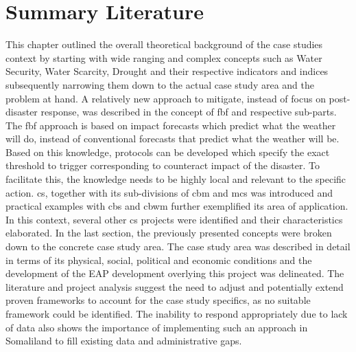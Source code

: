 
\section{Summary Literature}

This chapter outlined the overall theoretical background of the case studies context by starting with wide ranging and complex concepts such as Water Security, Water Scarcity, Drought and their respective indicators and indices subsequently narrowing them down to the actual case study area and the problem at hand.\newline
A relatively new approach to mitigate, instead of focus on post-disaster response, was described in the concept of \acrlong{fbf} and respective sub-parts. The \acrshort{fbf} approach is based on impact forecasts which predict what the weather will do, instead of conventional forecasts that predict what the weather will be. Based on this knowledge, protocols can be developed which specify the exact threshold to trigger corresponding  to counteract impact of the disaster. To facilitate this, the knowledge needs to be highly local and relevant to the specific action. \acrlong{cs}, together with its sub-divisions of \acrlong{cbm} and \acrlong{mcs} was introduced and practical examples with \acrlong{cbs} and \acrlong{cbwm} further exemplified its area of application. In this context, several other \acrshort{cs} projects were identified and their characteristics elaborated.\newline
In the last section, the previously presented concepts were broken down to the concrete case study area. The case study area was described in detail in terms of its physical, social, political and economic conditions and the development of the EAP development overlying this project was delineated.\newline
The literature and project analysis suggest the need to adjust and potentially extend proven frameworks to account for the case study specifics, as no suitable framework could be identified. The inability to respond appropriately due to lack of data also shows the importance of implementing such an approach in Somaliland to fill existing data and administrative gaps. 



